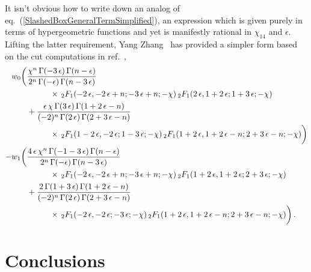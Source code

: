\documentclass[aps,prd,preprint,groupedaddress,nofootinbib,showpacs,eqsecnum]{revtex4}
\def\eqn#1{eq.~(\ref{#1})}
\def\eps{\epsilon}
\begin{document}
It isn't obvious how to write down an analog of 
\eqn{SlashedBoxGeneralTermSimplified}, an expression which is given
purely in terms of hypergeometric functions and yet is manifestly
rational in $\chi_{14}$ and $\eps$.  Lifting the latter requirement,
Yang Zhang~\cite{YangPrivate} has provided
a simpler form based on the cut computations in ref.~\cite{ZhangCut},
\begin{equation}
\begin{aligned}
w_0 \biggl(&\frac{\chi^{n}\,\Gamma(-3\,\eps)\,\Gamma(n-\eps)}
         {2^{n}\,\Gamma(-\eps)\,\Gamma(n-3\,\eps)}
\\& \hspace*{10mm} \times
  \,\F21(-2\,\eps,-2\,\eps+n;-3\,\eps+n;-\chi)
  \,\F21(2\,\eps,1+2\,\eps;1+3\,\eps;-\chi)
\\&+\frac{\eps\,\chi\,\Gamma(3\,\eps)\,\Gamma(1+2\,\eps-n)}
         {(-2)^{n}\,\Gamma(2\,\eps)\,\Gamma(2+3\,\eps-n)}
\\& \hspace*{10mm} \times
  \,\F21(1-2\,\eps,-2\,\eps;1-3\,\eps;-\chi)
  \,\F21(1+2\,\eps,1+2\,\eps-n;2+3\,\eps-n;-\chi)
\indentN %
\biggr)
\\ - w_1 \biggl(&
 \frac{4\,\eps\,\chi^{n}\,\Gamma(-1-3\,\eps)\,\Gamma(n-\eps)}
      {2^{n}\,\Gamma(-\eps)\,\Gamma(n-3\,\eps)}
\\& \hspace*{10mm} \times
  \,\F21(-2\,\eps,-2\,\eps+n;-3\,\eps+n;-\chi)
  \,\F21(1+2\,\eps,1+2\,\eps;2+3\,\eps;-\chi)
\\&+\frac{2\,\Gamma(1+3\,\eps)\,\Gamma(1+2\,\eps-n)}
         {(-2)^{n}\,\Gamma(2\,\eps)\,\Gamma(2+3\,\eps-n)}
\\& \hspace*{10mm} \times
  \,\F21(-2\,\eps,-2\,\eps;-3\,\eps;-\chi)
  \,\F21(1+2\,\eps,1+2\,\eps-n;2+3\,\eps-n;-\chi)
\indentN %
\biggr)
\,.
\end{aligned}
\end{equation}  

\section{Conclusions}
\label{ConclusionsSection}
\end{document}
